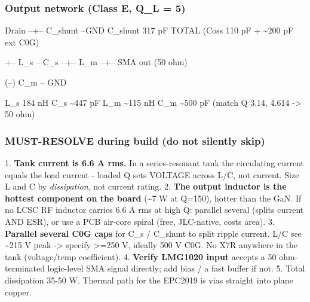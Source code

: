 \documentclass[11pt,a4paper]{article}
\begin{document}
\subsubsection*{Output network (Class E, Q\_L = 5)}
Drain --+-- C\_shunt --GND        C\_shunt 317 pF TOTAL (Coss 110 pF + \textasciitilde{}200 pF ext C0G)

\begin{quote}\small\ttfamily\raggedright
            \textbar{}
\end{quote}
+-- L\_s -- C\_s --+-- L\_m --+-- SMA out (50 ohm)

\begin{quote}\small\ttfamily\raggedright
                             \textbar{}         \textbar{}
\end{quote}
(--)      C\_m -- GND

L\_s 184 nH \textbar{} C\_s \textasciitilde{}447 pF \textbar{} L\_m \textasciitilde{}115 nH \textbar{} C\_m \textasciitilde{}500 pF (match Q 3.14, 4.614 -\textgreater{} 50 ohm)

\subsubsection*{MUST-RESOLVE during build (do not silently skip)}
1. \textbf{Tank current is 6.6 A rms.} In a series-resonant tank the circulating current equals the load current - loaded Q sets VOLTAGE across L/C, not current. Size L and C by \emph{dissipation}, not current rating. 2. \textbf{The output inductor is the hottest component on the board} (\textasciitilde{}7 W at Q=150), hotter than the GaN. If no LCSC RF inductor carries 6.6 A rms at high Q: parallel several (splits current AND ESR), or use a PCB air-core spiral (free, JLC-native, costs area). 3. \textbf{Parallel several C0G caps} for C\_s / C\_shunt to split ripple current. L/C see \textasciitilde{}215 V peak -\textgreater{} specify \textgreater{}=250 V, ideally 500 V C0G. No X7R anywhere in the tank (voltage/temp coefficient). 4. \textbf{Verify LMG1020 input} accepts a 50 ohm-terminated logic-level SMA signal directly; add bias / a fast buffer if not. 5. Total dissipation 35-50 W. Thermal path for the EPC2019 is vias straight into plane copper.
\end{document}
